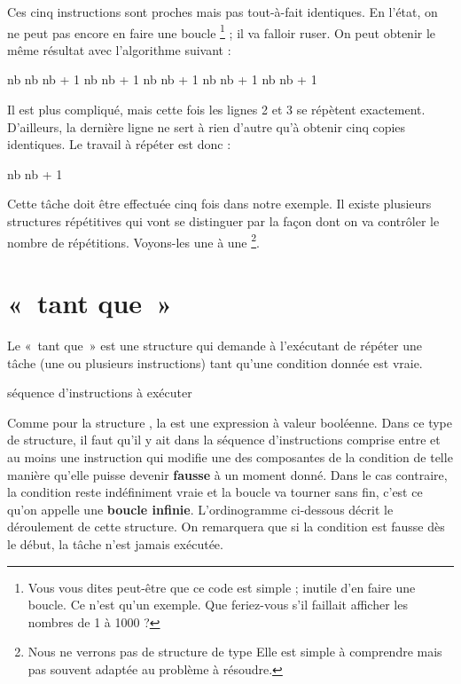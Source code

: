 		Ces cinq instructions sont proches mais pas tout-à-fait identiques. 
		En l'état, on ne peut pas encore en faire une boucle%
		\footnote{%
			Vous vous dites peut-être que ce code est simple ;
			inutile d'en faire une boucle.
			Ce n'est qu'un exemple.
			Que feriez-vous s'il faillait afficher les nombres
			de 1 à 1000 ?
		} ;
		il va falloir ruser.
		On peut obtenir le même résultat avec l'algorithme suivant :

		\begin{LDA}[1]
		\Let nb 
		\Let nb \Gets nb + 1
		\Let nb \Gets nb + 1
		\Let nb \Gets nb + 1
		\Let nb \Gets nb + 1
		\Let nb \Gets nb + 1
		\end{LDA}

		Il est plus compliqué,
		mais cette fois les lignes 2 et 3 se répètent exactement.
		D'ailleurs, la dernière ligne ne sert à rien d'autre qu'à
		obtenir cinq copies identiques.
		Le travail à répéter est donc :

		\begin{LDA}
		\Let nb \Gets nb + 1
		\end{LDA}

		Cette tâche doit être effectuée cinq fois dans notre exemple.
		Il existe plusieurs structures répétitives
		qui vont se distinguer par la façon dont on va
		contrôler le nombre de répétitions.
		Voyons-les une à une%
		\footnote{%
			Nous ne verrons pas de structure de type
			\lda{répéter 5 fois\dots}
			Elle est simple à comprendre
			mais pas souvent adaptée au problème à résoudre.
		}.

\section{«~tant que~»}
	
	Le «~tant que~» est une structure qui demande à
	l’exécutant de répéter une tâche (une ou plusieurs
	instructions) tant qu’une condition donnée est vraie.

	\begin{LDA}
	\While{condition}
		\Stmt séquence d’instructions à exécuter
	\EndWhile
	\end{LDA}

	Comme pour la structure , 
	la  est une expression à valeur booléenne. 
	Dans ce type de structure, 
	il faut qu’il y ait dans la séquence d’instructions comprise entre
	 et  au moins une
	instruction qui modifie une des composantes de la condition de telle
	manière qu’elle puisse devenir \textbf{fausse} à un moment donné. Dans
	le cas contraire, la condition reste indéfiniment vraie et la boucle va
	tourner sans fin, c’est ce qu’on appelle une \textbf{boucle infinie}. 
	L'ordinogramme ci-dessous décrit  le déroulement de cette structure. 
	On remarquera que si la condition est fausse dès le début, 
	la tâche n’est jamais exécutée.

